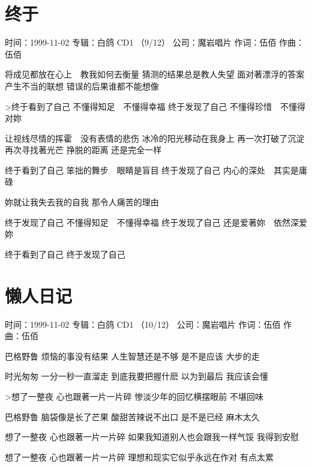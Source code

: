 \documentclass[UTF8,a4paper,oneside,twocolumn,12pt]{ctexbook}
\newcommand{\infopair}[2]{\textbullet #1：#2}
\newcommand{\zc}[1][伍佰]{\infopair{作词}{#1}}
\newcommand{\zq}[1][伍佰]{\infopair{作曲}{#1}}
\newcommand{\zj}[1]{\infopair{专辑}{#1}}
\newcommand{\sj}[1]{\infopair{时间}{#1}}
\newcommand{\gs}[1]{\infopair{公司}{#1}}
\newenvironment{info}{\begin{flushleft}\kaishu
	}
	{\end{flushleft}\normalsize\yahei\par}
\newenvironment{lyric}{
	}
{}
\begin{document}
\section{终于}
\begin{info}
	\sj{1999-11-02}
	\zj{白鸽 CD1 （9/12）}
	\gs{魔岩唱片}
	\zc
	\zq
\end{info}
\begin{lyric}
	将成见都放在心上　教我如何去衡量
	猜测的结果总是教人失望
	面对著漂浮的答案　产生不当的联想
	错误的后果谁都不能想像

	>终于看到了自己
	不懂得知足　不懂得幸福
	终于发现了自己
	不懂得珍惜　不懂得对妳

	让视线尽情的挥霍　没有表情的悲伤
	冰冷的阳光移动在我身上
	再一次打破了沉淀　再次寻找著光芒
	挣脱的距离  还是完全一样

	终于看到了自己
	笨拙的舞步　眼睛是盲目
	终于发现了自己
	内心的深处　其实是庸碌

	妳就让我失去我的自我
	那令人痛苦的理由

	终于发现了自己
	不懂得知足　不懂得幸福
	终于发现了自己
	还是爱著妳　依然深爱妳

	终于看到了自己
	终于发现了自己
\end{lyric}

\section{懒人日记}
\begin{info}
	\sj{1999-11-02}
	\zj{白鸽 CD1 （10/12）}
	\gs{魔岩唱片}
	\zc
	\zq
\end{info}
\begin{lyric}
	巴格野鲁 烦恼的事没有结果 人生智慧还是不够
	是不是应该 大步的走

	时光匆匆 一分一秒一直溜走 到底我要把握什麽
	以为到最后 我应该会懂

	>想了一整夜 心也跟著一片一片碎
	惨淡少年的回忆横摆眼前 不堪回味

	巴格野鲁 脑袋像是长了芒果 酸甜苦辣说不出口
	是不是已经 麻木太久

	想了一整夜 心也跟著一片一片碎
	如果我知道别人也会跟我一样气馁
	我得到安慰

	想了一整夜 心也跟著一片一片碎
	理想和现实它似乎永远在作对 有点太累
\end{lyric}
\end{document}
